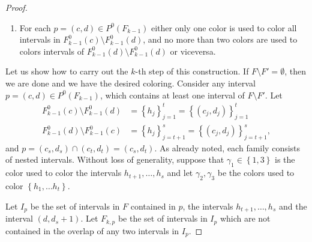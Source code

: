 \documentclass[12pt]{article}
\theoremstyle{definition}
\begin{document}
\begin{proof}
\begin{enumerate}
            \item For each $p =
                \left(c, d\right) \in 
                P^{0}\left(F_{k-1}\right)$ 
                either only one
                color is used to color
                all intervals in 
                $F^{0}_{k-1}\left(c\right) 
                \setminus F^{0}_{k-1}\left(d\right)$,
                and no more than 
                two colors are used to 
                colors intervals
                of $F^{0}_{k-1}\left(d\right)
                \setminus F^{0}_{k-1}\left(d\right)$
                or viceversa.
        \end{enumerate}
        Let us show how to carry out the 
        $k$-th step of this construction.
        If $F \setminus F' = \emptyset$,
        then we are done and we have 
        the desired coloring.
        Consider any interval
        $p = \left(c, d\right)
        \in P^{0}\left(F_{k-1}\right)$,
        which contains at least one interval
        of $F \setminus F'$. 
        Let
        \begin{align*}
            F^{0}_{k-1}\left(c\right) \setminus 
            F^{0}_{k-1}\left(d\right)
            &= \left\{h_{j}\right\}_{j=1}^{t}
            = \left\{\left(c_{j},
            d_{j}\right)\right\}_{j=1}^{t} \\
            F^{0}_{k-1}\left(d\right) \setminus 
            F^{0}_{k-1} \left(c\right)
            &= \left\{h_{j}\right\}_{j=t+1}^{s}
            = \left\{\left(c_{j},
            d_{j}\right)\right\}_{j=t+1}^{s},
        \end{align*}
        and $p = \left(c_{s}, d_{s}\right)
        \cap \left(c_{t}, d_{t}\right) = 
        \left(c_{s}, d_{t}\right)$.
        As already noted, each
        family consists of
        nested intervals.
        Without loss of generality,
        suppose that
        $\gamma_1 \in \left\{1, 3\right\}$
        is the color used to
        color the intervals
        $h_{t+1}, \ldots, h_{s}$
        and let $\gamma_{2}, \gamma_{3}$
        be the colors used to 
        color
        $\left\{h_1, \ldots h_t\right\}$.
        
        Let $I_{p}$ be the
        set of intervals in $F$ 
        contained in $p$,
        the intervals $h_{t+1},
        \ldots, h_{s}$ and the 
        interval 
        $\left(d, d_{s} + 1\right)$.
        Let $F_{k, p}$ be 
        the set of intervals in $I_{p}$ 
        which are not contained in
        the overlap of any two
        intervals in $I_{p}$. 


\end{proof}
\end{document}
